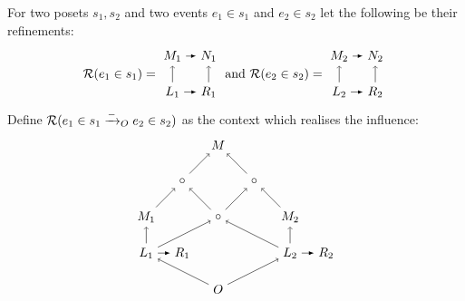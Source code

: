 \begin{definition}
  For two posets $s_1,s_2$ and two events $e_1\in s_1$ and $e_2\in s_2$ let the following be their refinements:
  \begin{align*}
    \mathcal{R}(e_1\in s_1) =
    \begin{tikzpicture}[baseline=0.4cm] %
      \node (mi) at (-2,1) {\(M_1\)};
      \node (mj) at (-1,1) {\(N_1\)};
      \node (r1) at (-1,0) {\(R_1\)};
      \node (l1) at (-2,0) {\(L_1\)};
      \draw [->] (l1) -- (mi);
      \draw [->] (r1) -- (mj);
      \draw [>=latex, ->] (mi) -- (mj);
      \draw [>=latex, ->] (l1) -- (r1);
    \end{tikzpicture}
    \text{ and }
    \mathcal{R}(e_2\in s_2) =
    \begin{tikzpicture}[baseline=0.4cm] %
      \node (mi) at (-2,1) {\(M_2\)};
      \node (mj) at (-1,1) {\(N_2\)};
      \node (r1) at (-1,0) {\(R_2\)};
      \node (l1) at (-2,0) {\(L_2\)};
      \draw [->] (l1) -- (mi);
      \draw [->] (r1) -- (mj);
      \draw [>=latex, ->] (mi) -- (mj);
      \draw [>=latex, ->] (l1) -- (r1);
    \end{tikzpicture}
  \end{align*}
  Define $\mathcal{R}(e_1\in s_1\mathrel{\xrightarrow{-}}_O e_2\in s_2)$ as the context which realises the influence:
  \[
  \begin{tikzpicture} %
        \node (o) at (0,-1) {\(O\)};
        \node (p) at (0,1) {\(\circ\)};
        \node (n) at (0,3) {\(M\)};
        \node (r1) at (-1,0) {\(R_1\)};
        \node (l1) at (-2,0) {\(L_1\)};
        \node (l2) at (2,0) {\(L_2\)};
        \node (r2) at (3,0) {\(R_2\)};
        \node (n1) at (-2,1) {\(M_1\)};
        \node (n2) at (2,1) {\(M_2\)};
        \node (p1) at (-1,2) {\(\circ\)};
        \node (p2) at (1,2) {\(\circ\)};
        \draw [->] (l1) -- (n1);
        \draw [->] (l2) -- (n2);
        \draw [->] (o) -- (l1);
        \draw [->] (o) -- (l2);
        \draw [->] (l1) -- (p);
        \draw [->] (l2) -- (p);
        \draw [->] (p) -- (p1);
        \draw [->] (p) -- (p2);
        \draw [->] (n1) -- (p1);
        \draw [->] (n2) -- (p2);
        \draw [->] (p1) -- (n);
        \draw [->] (p2) -- (n);
        \draw [>=latex, ->] (l1) -- (r1);
        \draw [>=latex, ->] (l2) -- (r2);
  \end{tikzpicture}
  \]
\end{definition}

